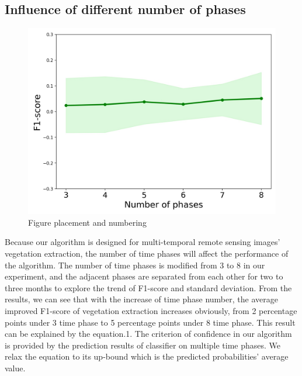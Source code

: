 \documentclass{isprs} %
\begin{document}
\subsection{ Influence of different number of phases}

\begin{figure}[ht!]
	\begin{center}
			\includegraphics[width=1.0\columnwidth]{figures/images/numberOfPhasesCompareVegImprovedMean_fill.jpg}
		\caption{Figure placement and numbering}
	\label{fig:studyArea}
	\end{center}
\end{figure}

Because our algorithm is designed for multi-temporal remote sensing images’ vegetation extraction, the number of time phases will affect the performance of the algorithm. The number of time phases is modified from 3 to 8 in our experiment, and the adjacent phases are separated from each other for two to three months to explore the trend of F1-score and standard deviation. From the results, we can see that with the increase of time phase number, the average improved F1-score of vegetation extraction increases obviously, from 2 percentage points under 3 time phase to 5 percentage points under 8 time phase. This result can be explained by the equation.1. The criterion of confidence in our algorithm is provided by the prediction results of classifier on multiple time phases. We relax the equation to its up-bound which is the predicted probabilities’ average value. 
\end{document}
